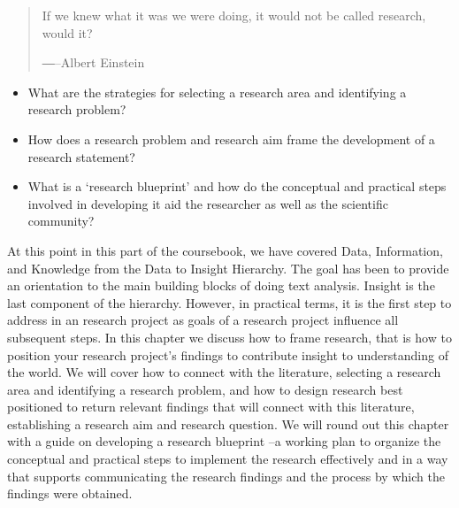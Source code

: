 \documentclass[
  letterpaper,
]{latex/krantz}
\providecommand{\tightlist}{%
  \setlength{\itemsep}{0pt}\setlength{\parskip}{0pt}}\usepackage{longtable,booktabs,array}
\begin{document}
\begin{quote}
If we knew what it was we were doing, it would not be called research,
would it?

―--Albert Einstein
\end{quote}

\begin{tcolorbox}[enhanced jigsaw, opacitybacktitle=0.6, breakable, colframe=quarto-callout-note-color-frame, arc=.35mm, left=2mm, leftrule=.75mm, title=\textcolor{quarto-callout-note-color}{\faInfo}\hspace{0.5em}{Keys}, opacityback=0, colback=white, toptitle=1mm, rightrule=.15mm, titlerule=0mm, bottomtitle=1mm, bottomrule=.15mm, coltitle=black, colbacktitle=quarto-callout-note-color!10!white, toprule=.15mm]

\begin{itemize}
\tightlist
\item
  What are the strategies for selecting a research area and identifying
  a research problem?
\item
  How does a research problem and research aim frame the development of
  a research statement?
\item
  What is a `research blueprint' and how do the conceptual and practical
  steps involved in developing it aid the researcher as well as the
  scientific community?
\end{itemize}

\end{tcolorbox}

At this point in this part of the coursebook, we have covered Data,
Information, and Knowledge from the Data to Insight Hierarchy. The goal
has been to provide an orientation to the main building blocks of doing
text analysis. Insight is the last component of the hierarchy. However,
in practical terms, it is the first step to address in an research
project as goals of a research project influence all subsequent steps.
In this chapter we discuss how to frame research, that is how to
position your research project's findings to contribute insight to
understanding of the world. We will cover how to connect with the
literature, selecting a research area and identifying a research
problem, and how to design research best positioned to return relevant
findings that will connect with this literature, establishing a research
aim and research question. We will round out this chapter with a guide
on developing a research blueprint --a working plan to organize the
conceptual and practical steps to implement the research effectively and
in a way that supports communicating the research findings and the
process by which the findings were obtained.
\end{document}
